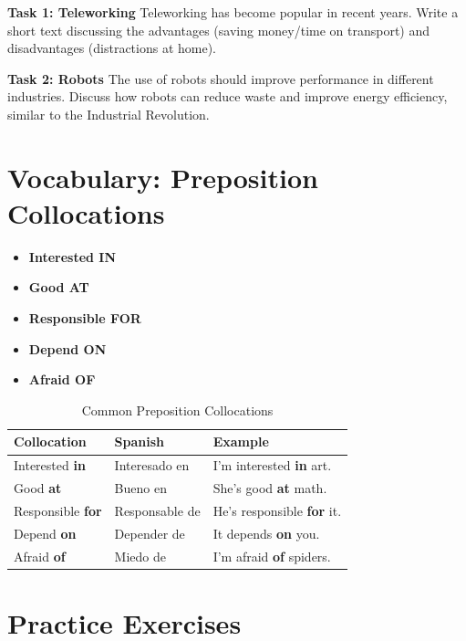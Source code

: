 \textbf{Task 1: Teleworking}
Teleworking has become popular in recent years. Write a short text discussing the advantages (saving money/time on transport) and disadvantages (distractions at home).

\textbf{Task 2: Robots}
The use of robots should improve performance in different industries. Discuss how robots can reduce waste and improve energy efficiency, similar to the Industrial Revolution.

\section{Vocabulary: Preposition Collocations}

\begin{vocabbox}[title=Preposition Collocations]
\begin{itemize}
    \item \textbf{Interested IN} 
    \item \textbf{Good AT} 
    \item \textbf{Responsible FOR} 
    \item \textbf{Depend ON} 
    \item \textbf{Afraid OF} 
\end{itemize}
\end{vocabbox}

\begin{table}[h]
\centering
\begin{tabular}{|l|p{4cm}|p{5cm}|}
\hline
\textbf{Collocation} & \textbf{Spanish} & \textbf{Example} \\
\hline
Interested \textbf{in} & Interesado en & I'm interested \textbf{in} art. \\
\hline
Good \textbf{at} & Bueno en & She's good \textbf{at} math. \\
\hline
Responsible \textbf{for} & Responsable de & He's responsible \textbf{for} it. \\
\hline
Depend \textbf{on} & Depender de & It depends \textbf{on} you. \\
\hline
Afraid \textbf{of} & Miedo de & I'm afraid \textbf{of} spiders. \\
\hline
\end{tabular}
\caption{Common Preposition Collocations}
\end{table}

\section{Practice Exercises}


